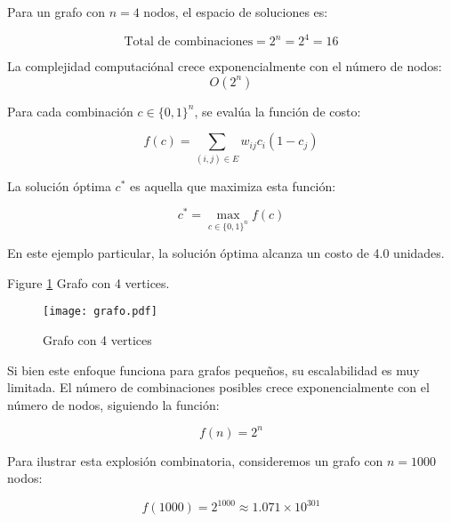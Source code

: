 \documentclass[9pt,a4paper,twoside]{rho-class/rho}
\begin{document}
            Para un grafo con $n=4$ nodos, el espacio de soluciones es:

            \begin{equation}
                \text{Total de combinaciones} = 2^n = 2^4 = 16
            \end{equation}

            La complejidad computaciónal crece exponencialmente con el número de nodos: \begin{equation}O(2^n)\end{equation}

            Para cada combinación $c \in \{0,1\}^n$, se evalúa la función de costo:

            \begin{equation}
                f(c) = \sum_{(i,j) \in E} w_{ij}c_i(1-c_j)
            \end{equation}

            La solución óptima $c^*$ es aquella que maximiza esta función:

            \begin{equation}
                c^* = \max_{c \in \{0,1\}^n} f(c)
            \end{equation}

            En este ejemplo particular, la solución óptima alcanza un costo de 4.0 unidades.

            Figure \ref{fig:figure} Grafo con 4 vertices.
                
            \begin{figure}[H]
                \centering
                \texttt{[image: grafo.pdf]}
                \caption{Grafo con 4 vertices}
                \label{fig:figure}
            \end{figure}

            Si bien este enfoque funciona para grafos pequeños, su escalabilidad es muy limitada. El número de combinaciones posibles crece exponencialmente con el número de nodos, siguiendo la función:

            \begin{equation}
                f(n) = 2^n
            \end{equation}

            Para ilustrar esta explosión combinatoria, consideremos un grafo con $n = 1000$ nodos:

            \begin{equation}
                f(1000) = 2^{1000} \approx 1.071 \times 10^{301}
            \end{equation}
\end{document}
